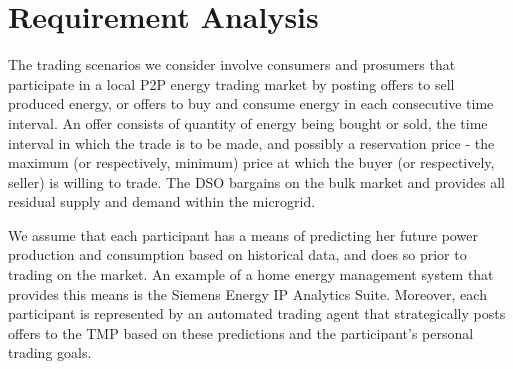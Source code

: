 \documentclass[sigplan]{acmart}
\begin{document}




\section{Requirement Analysis}\label{sec:requirements}


The trading scenarios we consider involve consumers and prosumers that participate in a local P2P energy trading market by posting offers to sell produced energy, or offers to buy and consume energy in each consecutive time interval. An offer consists of quantity of energy being bought or sold, the time interval in which the trade is to be made, and possibly a reservation price - the maximum (or respectively, minimum) price at which the buyer (or respectively, seller) is willing to trade. The DSO bargains on the bulk market and provides all residual supply and demand within the microgrid. 

We assume that each participant has a means of predicting her future power production and consumption based on historical data, and does so prior to trading on the market. An example of a home energy management system that provides this means is the Siemens Energy IP Analytics Suite.
Moreover, each participant is represented by an automated trading agent that strategically posts offers to the TMP based on these predictions and the participant's personal trading goals.
\end{document}

